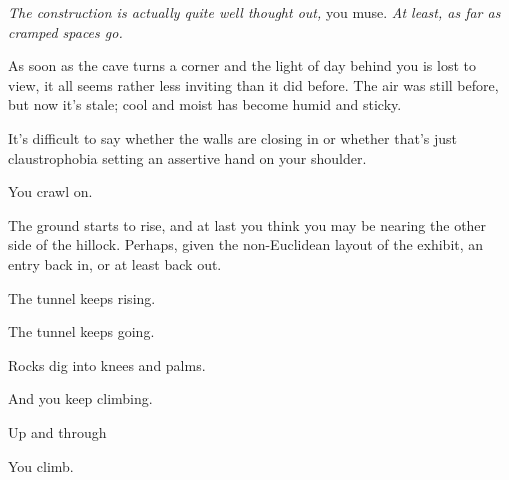 \emph{The construction is actually quite well thought out,} you muse. \emph{At least, as far as cramped spaces go.}


As soon as the cave turns a corner and the light of day behind you is lost to view, it all seems rather less inviting than it did before. The air was still before, but now it's stale; cool and moist has become humid and sticky.

It's difficult to say whether the walls are closing in or whether that's just claustrophobia setting an assertive hand on your shoulder.

You crawl on.

The ground starts to rise, and at last you think you may be nearing the other side of the hillock. Perhaps, given the non-Euclidean layout of the exhibit, an entry back in, or at least back out.

\vfill

\newpage

\null
\vfill

The tunnel keeps rising.

\newpage

\null
\vfill

The tunnel keeps going.

\vspace{1in}

\newpage

\null
\vfill

Rocks dig into knees and palms.

\null
\vspace{1.5in}

\newpage

\null
\vfill

And you keep climbing.

\null
\vspace{2in}

\newpage

\null
\vfill

Up and through

\null
\vfill

\newpage

\newpage

\null
\vspace{2in}

You climb.

\newpage

\null
\vspace{1.5in}

